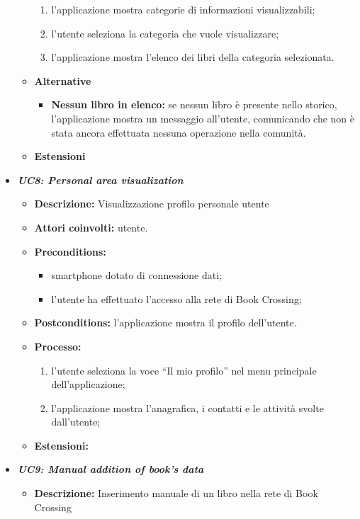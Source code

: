 \begin{itemize}
\begin{itemize}
\begin{enumerate}
			\item l’applicazione mostra categorie di informazioni visualizzabili;
			\item l’utente seleziona la categoria che vuole visualizzare;
			\item l'applicazione mostra l'elenco dei libri della categoria selezionata.
		\end{enumerate}
		\item \textbf{Alternative}
		\begin{itemize}
			\item \textbf{Nessun libro in elenco:} se nessun libro è presente nello storico, l'applicazione mostra un messaggio all'utente, comunicando che non è stata ancora effettuata nessuna operazione nella comunità.
		\end{itemize}
		\item \textbf{Estensioni}
	\end{itemize}
	\item \textbf{\textit{UC8: Personal area visualization}}
	\begin{itemize}
		\item \textbf{Descrizione: } Visualizzazione profilo personale utente
		\item \textbf{Attori coinvolti:} utente.
		\item \textbf{Preconditions:}
		\begin{itemize}
			\item smartphone dotato di connessione dati;
			\item l’utente ha effettuato l’accesso alla rete di Book Crossing;
		\end{itemize}
		\item \textbf{Postconditions: }l’applicazione mostra il profilo dell’utente.
		\item \textbf{Processo: }
		\begin{enumerate}
			\item l’utente seleziona la voce “Il mio profilo” nel menu principale dell’applicazione;
			\item l’applicazione mostra l’anagrafica, i contatti e le attività svolte dall’utente;
		\end{enumerate}
		\item \textbf{Estensioni:}
	\end{itemize}
	\item \textbf{\textit{UC9: Manual addition of book's data}}
	\begin{itemize}
		\item \textbf{Descrizione:} Inserimento manuale di un libro nella rete di Book Crossing

\end{itemize}
\end{itemize}
